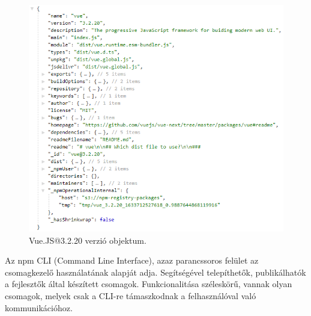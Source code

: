 \begin{figure}[h]
	\centering
	\includegraphics[scale=0.5]{images/registry_vue_version.png}
	\caption{Vue.JS@3.2.20 verzió objektum.}
	\label{fig:registry-vue-version}
\end{figure}

\pagebreak


Az npm CLI (Command Line Interface), azaz parancssoros felület az csomagkezelő használatának alapját adja. Segítségével telepíthetők, publikálhatók a fejlesztők által készített csomagok. Funkcionalitása széleskörű, vannak olyan csomagok, melyek csak a CLI-re támaszkodnak a felhasználóval való kommunikációhoz.


